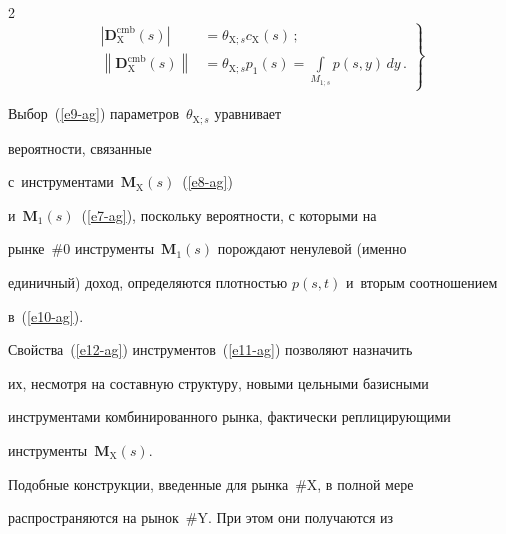 \begin{multicols}{2}
  \begin{equation}


  \left.


  \begin{array}{rl}


  \left\vert \boldsymbol{D}^{\mathrm{cmb}}_{\mathrm{X}}(s)\right\vert &=


\theta_{\mathrm{X};s} c_{\mathrm{X}}(s)\,;\\[6pt]


  \left\| \boldsymbol{D}^{\mathrm{cmb}}_{\mathrm{X}}(s)\right\| 


&=\displaystyle \theta_{\mathrm{X};s} p_1(s)=\int\limits_{M_{1;s}} p(s,y)\,dy\,.


\end{array}


\right\}


  \label{e12-ag}


  \end{equation}


  


  Выбор~(\ref{e9-ag}) параметров~$\theta_{\mathrm{X};s}$ уравнивает 


вероятности, связанные 


с~инструментами~$\boldsymbol{M}_{\mathrm{X}}(s)$~(\ref{e8-ag}) 


и~$\boldsymbol{M}_1(s)$~(\ref{e7-ag}), поскольку вероятности, с которыми на 


рынке~\#0 инструменты~$\boldsymbol{M}_1(s)$ порождают ненулевой (именно 


единичный) доход, определяются плотностью $p(s, t)$ и~вторым соотношением 


в~(\ref{e10-ag}). 


  


  Свойства~(\ref{e12-ag}) инструментов~(\ref{e11-ag}) позволяют назначить 


их, несмотря на составную структуру, новыми цельными базисными 


инструментами комбинированного рынка, фактически реплицирующими 


инструменты~$\boldsymbol{M}_{\mathrm{X}}(s)$. 


  


  Подобные конструкции, введенные для рынка~\#X, в полной мере 


распространяются на рынок~\#Y. При этом они получаются из 



\end{multicols}
